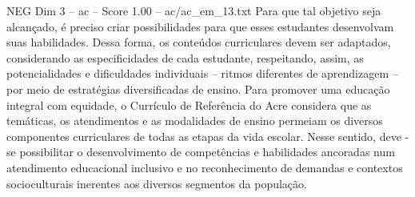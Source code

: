 \begin{textsample}{NEG Dim 3 – ac – Score 1.00 – ac/ac\_em\_13.txt}
Para que tal objetivo seja alcançado, é preciso criar possibilidades para que esses estudantes desenvolvam suas habilidades.
Dessa forma, os conteúdos curriculares devem ser adaptados, considerando as especificidades de cada estudante, respeitando, assim, as potencialidades e dificuldades individuais – ritmos diferentes de aprendizagem – por meio de estratégias diversificadas de ensino.
Para promover uma educação integral com equidade, o Currículo de Referência do Acre considera que as temáticas, os atendimentos e as modalidades de ensino permeiam os diversos componentes curriculares de todas as etapas da vida escolar.
Nesse sentido, deve -se possibilitar o desenvolvimento de competências e habilidades ancoradas num atendimento educacional inclusivo e no reconhecimento de demandas e contextos socioculturais inerentes aos diversos segmentos da população.

\end{textsample}
